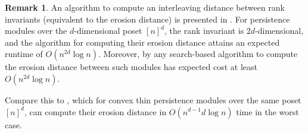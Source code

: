 \documentclass[a4paper,UKenglish,thm-restate]{article}
\theoremstyle{definition}
\newtheorem{remark}[theorem]{Remark}
\begin{document}
            \begin{remark}
                An algorithm to compute an interleaving distance between rank invariants (equivalent to the erosion distance) is presented in \cite[Theorem 5.4]{spatiotemporal}. For persistence modules over the $d$-dimensional poset $[n]^d$, the rank invariant is $2d$-dimensional, and the algorithm \cite[Theorem 5.4]{spatiotemporal} for computing their erosion distance attains an expected runtime of $O(n^{2d} \log{n})$. Moreover, by \cite[Section 4]{searchcomplexity} any search-based algorithm to compute the erosion distance between such modules has expected cost at least $O(n^{2d} \log{n})$.

                Compare this to , which for convex thin persistence modules over the same poset $[n]^d$, can compute their erosion distance in $O(n^{d-1}d\log n)$ time in the worst case. 
            \end{remark}
\end{document}
